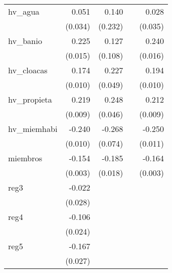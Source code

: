 {\begin{longtable}{l*{4}{D{.}{.}{-1}}}
\addlinespace
hv\_agua     &       0.051         &       0.140         &                     &       0.028         \\
            &     (0.034)         &     (0.232)         &                     &     (0.035)         \\
\addlinespace
hv\_banio    &       0.225\sym{***}&       0.127         &                     &       0.240\sym{***}\\
            &     (0.015)         &     (0.108)         &                     &     (0.016)         \\
\addlinespace
hv\_cloacas  &       0.174\sym{***}&       0.227\sym{***}&                     &       0.194\sym{***}\\
            &     (0.010)         &     (0.049)         &                     &     (0.010)         \\
\addlinespace
hv\_propieta &       0.219\sym{***}&       0.248\sym{***}&                     &       0.212\sym{***}\\
            &     (0.009)         &     (0.046)         &                     &     (0.009)         \\
\addlinespace
hv\_miemhabi &      -0.240\sym{***}&      -0.268\sym{***}&                     &      -0.250\sym{***}\\
            &     (0.010)         &     (0.074)         &                     &     (0.011)         \\
\addlinespace
miembros    &      -0.154\sym{***}&      -0.185\sym{***}&                     &      -0.164\sym{***}\\
            &     (0.003)         &     (0.018)         &                     &     (0.003)         \\
\addlinespace
reg3        &      -0.022         &                     &                     &                     \\
            &     (0.028)         &                     &                     &                     \\
\addlinespace
reg4        &      -0.106\sym{***}&                     &                     &                     \\
            &     (0.024)         &                     &                     &                     \\
\addlinespace
reg5        &      -0.167\sym{***}&                     &                     &                     \\
            &     (0.027)         &                     &                     &                     \\

\end{longtable}}
